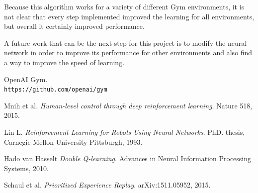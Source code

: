 \documentclass{article}
\begin{document}
Because this algorithm works for a variety of different Gym environments, it is not clear that every step implemented improved the learning for all environments, but overall it certainly improved performance.

A future work that can be the next step for this project is to modify the neural network in order to improve its performance for other environments and also find a way to improve the speed of learning.

\begin{thebibliography}{9}

OpenAI Gym.
\\\texttt{https://github.com/openai/gym}

Mnih et al.
\textit{Human-level control through deep reinforcement learning}. 
Nature 518, 2015.

Lin L.
\textit{Reinforcement Learning for Robots Using Neural Networks}. 
PhD. thesis, Carnegie Mellon University Pittsburgh, 1993.

Hado van Hasselt
\textit{Double Q-learning}.
Advances in Neural Information Processing Systems, 2010.

Schaul et al.
\textit{Prioritized Experience Replay}.
arXiv:1511.05952, 2015.

\end{thebibliography}
\end{document}
